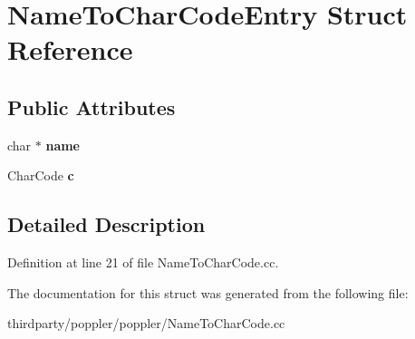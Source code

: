 \hypertarget{struct_name_to_char_code_entry}{}\section{Name\+To\+Char\+Code\+Entry Struct Reference}
\label{struct_name_to_char_code_entry}
\subsection*{Public Attributes}
\begin{DoxyCompactItemize}
\item 
\mbox{\label{struct_name_to_char_code_entry_af755bad9269a5dbc25d8187fbffb8f8d}} 
char $\ast$ {\bfseries name}
\item 
\mbox{\label{struct_name_to_char_code_entry_af3f9f7cfd86031cf309b1bc3bc3abceb}} 
Char\+Code {\bfseries c}
\end{DoxyCompactItemize}


\subsection{Detailed Description}


Definition at line 21 of file Name\+To\+Char\+Code.\+cc.



The documentation for this struct was generated from the following file\+:\begin{DoxyCompactItemize}
\item 
thirdparty/poppler/poppler/Name\+To\+Char\+Code.\+cc\end{DoxyCompactItemize}

